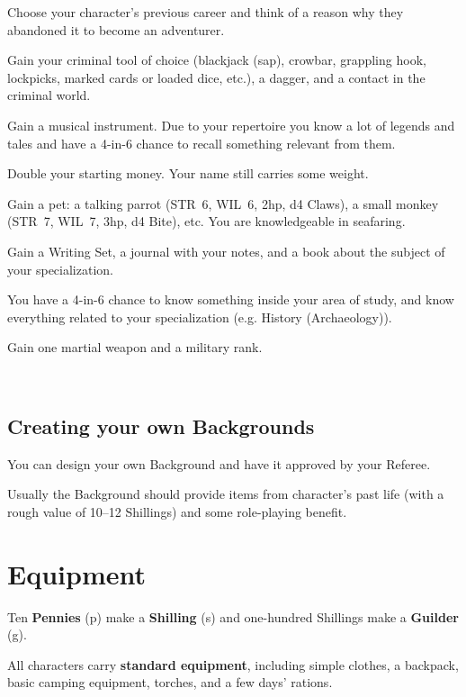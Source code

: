 \documentclass[itdr]{subfiles}
\begin{document}
Choose your character's previous career and think of a reason why they abandoned it to become an adventurer.

Gain your criminal tool of choice (blackjack (sap), crowbar, grappling hook, lockpicks, marked cards or loaded dice, etc.), a dagger, and a contact in the criminal world.

Gain a musical instrument. Due to your repertoire you know a lot of legends and tales and have a 4-in-6 chance to recall something relevant from them.

Double your starting money. Your name still carries some weight.

Gain a pet: a talking parrot (STR~6, WIL~6, 2hp, d4 Claws), a small monkey (STR~7, WIL~7, 3hp, d4 Bite), etc. You are knowledgeable in seafaring.

Gain a Writing Set, a journal with your notes, and a book about the subject of your specialization.

You have a 4-in-6 chance to know something inside your area of study, and know everything related to your specialization (e.g. History (Archaeology)).

Gain one martial weapon and a military rank.

~

\begin{dbox}
\subsection*{Creating your own Backgrounds}

You can design your own Background and have it approved by your Referee.

Usually the Background should provide items from character's past life (with a rough value of 10--12 Shillings) and some role-playing benefit.
\end{dbox}

\vfill
\clearpage


\section{Equipment}

Ten \textbf{Pennies} (p) make a \textbf{Shilling} (s) and one-hundred Shillings make a \textbf{Guilder} (g).

All characters carry \textbf{standard equipment}, including simple clothes, a backpack, basic camping equipment, torches, and a few days' rations.
\end{document}
